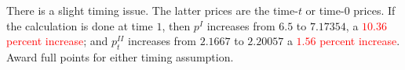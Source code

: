 \documentclass[12pt]{pracjourn_rwr}
\theoremstyle{definition}
\theoremstyle{remark}
\begin{document}
\begin{itemize}
\begin{itemize}
There is a slight timing issue.
The latter prices are the time-$t$ or time-$0$ prices.
If the calculation is done at time $1$, then
$p^{I}$ increases from $6.5$ to $7.17354$, a \textcolor{red}{$10.36$ percent increase}; and
$p_{t}^{II}$ increases from $2.1667$ to $2.20057$ a \textcolor{red}{$1.56$ percent increase}.
Award full points for either timing assumption.
\end{itemize}
\end{itemize}

% 
% 
\end{document}
